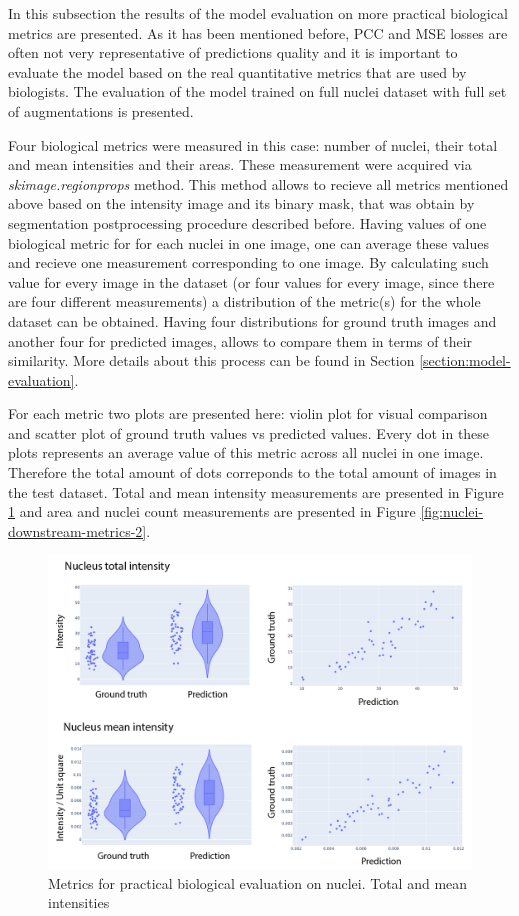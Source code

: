 In this subsection the results of the model evaluation on more practical biological metrics are presented. As it has been mentioned before, PCC and MSE losses are often not very representative of predictions quality and it is important to evaluate the model based on the real quantitative metrics that are used by biologists. The evaluation of the model trained on full nuclei dataset with full set of augmentations is presented. 

Four biological metrics were measured in this case: number of nuclei, their total and mean intensities and their areas. These measurement were acquired via \textit{skimage.regionprops} method. This method allows to recieve all metrics mentioned above based on the intensity image and its binary mask, that was obtain by segmentation postprocessing procedure described before. Having values of one biological metric for for each nuclei in one image, one can average these values and recieve one measurement corresponding to one image. By calculating such value for every image in the dataset (or four values for every image, since there are four different measurements) a distribution of the metric(s) for the whole dataset can be obtained. Having four distributions for ground truth images and another four for predicted images, allows to compare them in terms of their similarity. More details about this process can be found in Section \ref{section:model-evaluation}.

For each metric two plots are presented here: violin plot for visual comparison and scatter plot of ground truth values vs predicted values. Every dot in these plots represents an average value of this metric across all nuclei in one image. Therefore the total amount of dots correponds to the total amount of images in the test dataset. Total and mean intensity measurements are presented in Figure \ref{fig:nuclei-downstream-metrics-1} and area and nuclei count measurements are presented in Figure \ref{fig:nuclei-downstream-metrics-2}.

\begin{figure}[htb]
	\begin{center}
		\includegraphics[width=0.8\linewidth]{bilder/nuclei/metric/combined-metrics-2.png}
		\caption{Metrics for practical biological evaluation on nuclei. Total and mean intensities}\label{fig:nuclei-downstream-metrics-1}
	\end{center}
\end{figure}

